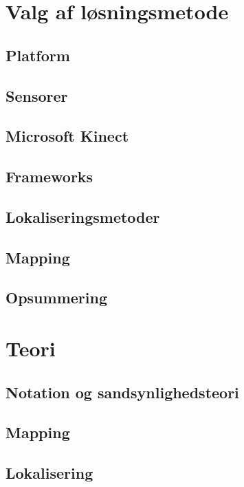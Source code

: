 \clearpage

\part{Valg af løsningsmetode}


\chapter{Platform}

\chapter{Sensorer}

\chapter{Microsoft Kinect}

\chapter{Frameworks}



\chapter{Lokaliseringsmetoder}

\chapter{Mapping}

\chapter{Opsummering}


\part{Teori}
\chapter{Notation og sandsynlighedsteori}

\chapter{Mapping}


\chapter{Lokalisering}


